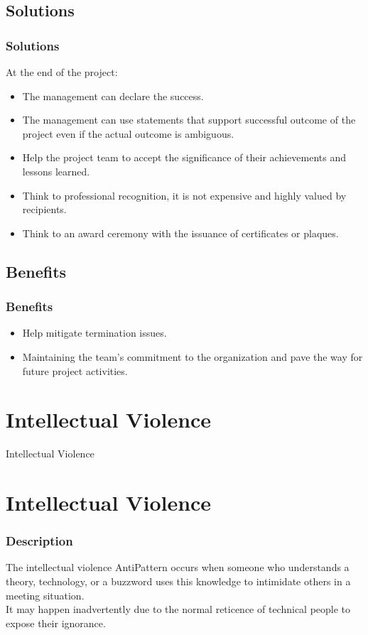\documentclass{beamer}
\begin{document}
\subsection{Solutions}
\begin{frame}
\frametitle{Solutions}
At the end of the project:
\begin{itemize}
\item The management can declare the success.
\item The management can use statements that support successful outcome of the project even if the actual outcome is ambiguous.
\item Help the project team to accept the significance of their achievements and lessons learned.
\item Think to professional recognition, it is not expensive and highly valued by recipients.
\item Think to an award ceremony with the issuance of certificates or plaques.
\end{itemize}
 
\end{frame}

\subsection{Benefits}
\begin{frame}
\frametitle{Benefits}
\begin{itemize}
\item Help mitigate termination issues.
\item Maintaining the team's commitment to the organization and pave the way for future project activities.
\end{itemize}
\end{frame}
\section{Intellectual Violence}
\begin{center}
\begin{frame}
Intellectual Violence
\end{frame}
\end{center}
\section{Intellectual Violence}
\begin{frame}
\frametitle{Description}
The intellectual violence AntiPattern occurs when someone who understands a theory, technology, or a buzzword uses this knowledge to intimidate others in a meeting situation.\\
It may happen inadvertently due to the normal reticence of technical people to expose their ignorance.
\end{frame}
\end{document}
